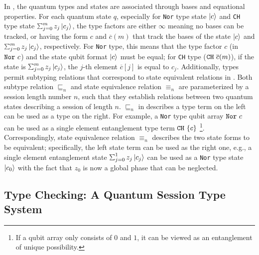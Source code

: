 In \qafny, the quantum types and states are associated through bases and equational properties.
For each quantum state $q$, especially for \texttt{Nor} type state $\left\vert{c}\right\rangle$ and \texttt{CH} type state $\sch{m}{z_j}{c_j}$, the type factors are either $\infty$ meaning no bases can be tracked, or having the form $c$ and $\overline{c}(m)$ that track the bases of the state $\left\vert{c}\right\rangle$ and $\sch{m}{z_j}{c_j}$, respectively. For \texttt{Nor} type, this means that the type factor $c$ (in $\texttt{Nor}~{c}$) and the state qubit format $\left\vert{c}\right\rangle$ must be equal; for \texttt{CH} type ($\texttt{CH}~{\overline{c}(m)}$), if the state is $\sch{m}{z_j}{c_j}$, the $j$-th element $\overline{c}[j]$ is equal to $c_j$.
Additionally, \qafny types permit subtyping relations that correspond to state equivalent relations in . 
Both subtype relation $\sqsubseteq_n$ and state equivalence relation $\equiv_n$ are parameterized by a session length number $n$, such that they establish relations between two quantum states describing a session of length $n$.
$\sqsubseteq_n$ in  describes a type term on the left can be used as a type on the right. For example, a \texttt{Nor} type qubit array $\texttt{Nor}~{c}$ can be used as a single element entanglement type term $\texttt{CH}~{\{c\}}$ \footnote{If a qubit array only consists of $0$ and $1$, it can be viewed as an entanglement of unique possibility. }. 
Correspondingly, state equivalence relation $\equiv_n$ describes the two state forms to be equivalent; specifically, the left state term can be used as the right one, e.g., a single element entanglement state $\sch{1}{z_j}{c_j}$ can be used as a \texttt{Nor} type state $\left\vert{c_0}\right\rangle$ with the fact that $z_0$ is now a global phase that can be neglected.


\subsection{Type Checking: A Quantum Session Type System}\label{sec:typesystemappx}

